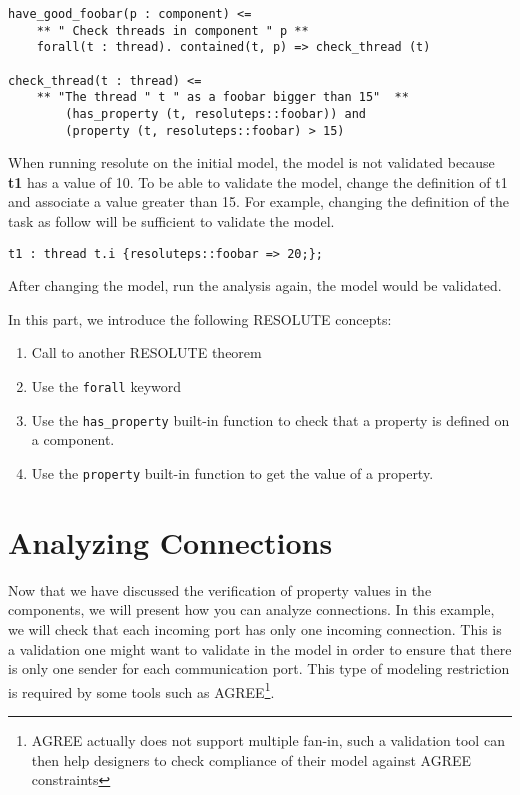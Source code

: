\documentclass[times, 10pt]{article}
\begin{document}
\begin{lstlisting}
have_good_foobar(p : component) <=
	** " Check threads in component " p **
    forall(t : thread). contained(t, p) => check_thread (t)

check_thread(t : thread) <=
  	** "The thread " t " as a foobar bigger than 15"  **
  		(has_property (t, resoluteps::foobar)) and 
  		(property (t, resoluteps::foobar) > 15)
\end{lstlisting}

When running resolute on the initial model, the model
is not validated because \textbf{t1} has
a value of 10. To be able to validate the model,
change the definition of t1 and associate a value greater
than 15. For example, changing the definition
of the task as follow will be sufficient to validate the model.

\begin{lstlisting}
t1 : thread t.i {resoluteps::foobar => 20;};
\end{lstlisting}

After changing the model, run the analysis again, the
model would be validated.

In this part, we introduce the following RESOLUTE concepts:
\begin{enumerate}
    \item
        Call to another RESOLUTE theorem
    \item
        Use the \texttt{forall} keyword
    \item
        Use the \texttt{has\_property} built-in function to check
        that a property is defined on a component.
    \item
        Use the \texttt{property} built-in function to get the value
        of a property.
\end{enumerate}



\section{Analyzing Connections}
Now that we have discussed the verification of property values
in the components, we will present how you can analyze connections.
In this example, we will check that each incoming port
has only one incoming connection. This is a validation
one might want to validate in the model in order to ensure
that there is only one sender for each communication port.
This type of modeling restriction is required by some tools such
as AGREE\footnote{AGREE actually does not support multiple fan-in, such
a validation tool can then help designers to check compliance of their model
against AGREE constraints}.
\end{document}
